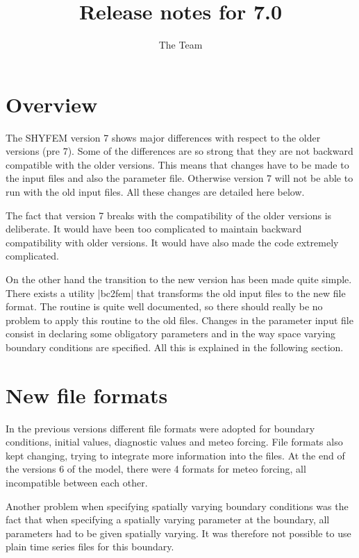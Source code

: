 \documentclass[12pt,draft]{article}
\title{Release notes for \shyfem{} 7.0}
\author{The \shyfem{} Team}
\newcommand{\shyfem}{SHYFEM}
\begin{document}
\maketitle


\section{Overview}


The \shyfem{} version 7 shows major differences with respect to 
the older versions (pre 7). Some of the differences are so
strong that they are not backward compatible with the older versions. This means that changes have to be made to the
input files and also the parameter file. Otherwise version 7
will not be able to run with the old input files. All these changes
are detailed here below.

The fact that version 7 breaks with the compatibility of
the older versions is deliberate. It would have been too complicated
to maintain backward compatibility with older versions. It would
have also made the code extremely complicated.

On the other hand the transition to the new version has been made
quite simple. There exists a utility |bc2fem| that transforms the
old input files to the new file format. The routine is quite 
well documented, so there should really be no problem to
apply this routine to the old files. Changes in the parameter input
file consist in declaring some obligatory parameters and
in the way space varying boundary conditions are specified. All this
is explained in the following section.


\section{New file formats}


In the previous versions different file formats were adopted for 
boundary conditions, initial values,
diagnostic values and meteo forcing. File formats also kept
changing, trying to integrate more information into
the files. At the end of the versions 6 of the model, there were
4 formats for meteo forcing, all incompatible between each other.

Another problem when specifying spatially varying boundary
conditions was the fact that when specifying a spatially
varying parameter at the boundary, all parameters had to
be given spatially varying. It was therefore not possible to 
use plain time series files for this boundary.
\end{document}
